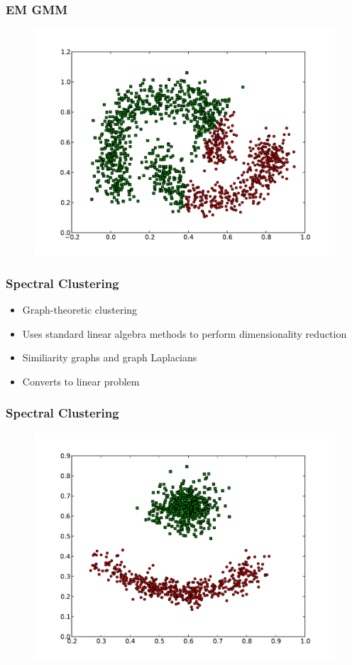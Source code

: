 \documentclass{beamer}
\begin{document}
\begin{frame}
\frametitle{EM GMM}
    \begin{figure}[]
    \includegraphics[scale=0.3]{GMM_half-moons.pdf}
    \end{figure}
\end{frame}



\begin{frame}
\frametitle{Spectral Clustering}
    \begin{itemize}
	\item Graph-theoretic clustering
    	\item Uses standard linear algebra methods to perform dimensionality reduction
   	\item Similiarity graphs and graph Laplacians
   	\item Converts to linear problem
    \end{itemize}
\end{frame}

\begin{frame}
\frametitle{Spectral Clustering}
    \begin{figure}[]
    \includegraphics[scale=0.3]{spectral_red-blue-cluster.pdf}
    \end{figure}
\end{frame}
\end{document}
